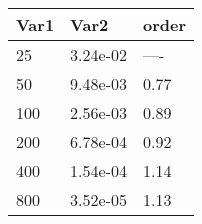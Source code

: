 \begin{tabular}{lll}
    Var1 & Var2     & order \\
    \hline
    25   & 3.24e-02 & ----  \\
    50   & 9.48e-03 & 0.77  \\
    100  & 2.56e-03 & 0.89  \\
    200  & 6.78e-04 & 0.92  \\
    400  & 1.54e-04 & 1.14  \\
    800  & 3.52e-05 & 1.13  \\
    \hline
\end{tabular}